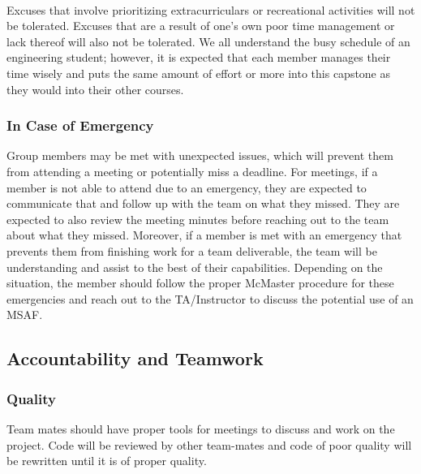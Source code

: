 \documentclass{article}
\begin{document}
{
\\Excuses that involve prioritizing extracurriculars or recreational activities will not be tolerated.
Excuses that are a result of one's own poor time management or lack thereof will also not be tolerated.
We all understand the busy schedule of an engineering student; however, it is expected that each member 
manages their time wisely and puts the same amount of effort or 
more into this capstone as they would into their other courses.



\subsubsection*{In Case of Emergency}


Group members may be met with unexpected issues, which will prevent them 
from attending a meeting or potentially miss a deadline. For meetings, 
if a member is not able to attend due to an emergency, they are expected 
to communicate that and follow up with the team on what they missed. 
They are expected to also review the meeting minutes before reaching 
out to the team about what they missed. Moreover, if a member is met 
with an emergency that prevents them from finishing work for a team 
deliverable, the team will be understanding and assist to the best 
of their capabilities. Depending on the situation, the member should 
follow the proper McMaster procedure for these emergencies and reach 
out to the TA/Instructor to discuss the potential use of an MSAF.

\subsection*{Accountability and Teamwork}

\subsubsection*{Quality} 

Team mates should have proper tools for meetings to discuss and work 
on the project.
Code will be reviewed by other team-mates and code of poor quality 
will be rewritten  until it is of proper quality.

}
\end{document}
